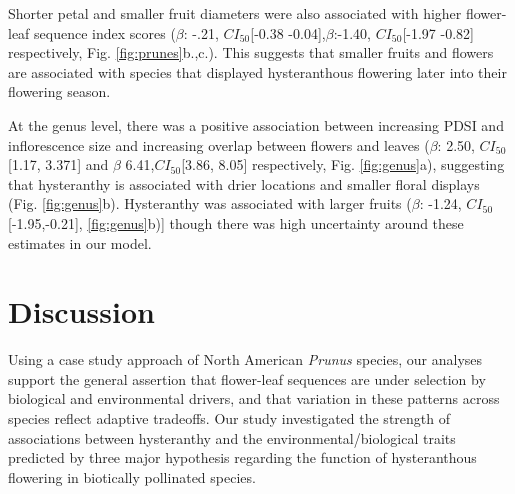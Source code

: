 \documentclass{article}[11pt]
\begin{document}
Shorter petal and smaller fruit diameters were also associated with higher flower-leaf sequence index scores ($\beta$: -.21, $CI_{50}$[-0.38 -0.04],$\beta$:-1.40, $CI_{50}$[-1.97 -0.82] respectively, Fig. \ref{fig:prunes}b.,c.). This suggests that smaller fruits and flowers are associated with species that displayed hysteranthous flowering later into their flowering season.


At the genus level, there was a positive association between increasing PDSI and inflorescence size and increasing overlap between flowers and leaves  ($\beta$: 2.50, $CI_{50}$[1.17, 3.371] and $\beta$ 6.41,$CI_{50}$[3.86, 8.05] respectively, Fig. \ref{fig:genus}a), suggesting that hysteranthy is associated with drier locations and smaller floral displays (Fig. \ref{fig:genus}b). Hysteranthy was associated with larger fruits  ($\beta$: -1.24, $CI_{50}$[-1.95,-0.21], \ref{fig:genus}b)]  though there was high uncertainty around these estimates in our model. 

\section*{Discussion}
Using a case study approach of North American \emph{Prunus} species, our analyses support the general assertion that flower-leaf sequences are under selection by biological and environmental drivers, and that variation in these patterns across species reflect adaptive tradeoffs. Our study investigated the strength of associations between hysteranthy and the environmental/biological traits predicted by three major hypothesis regarding the function of hysteranthous flowering in biotically pollinated species. 
\end{document}
